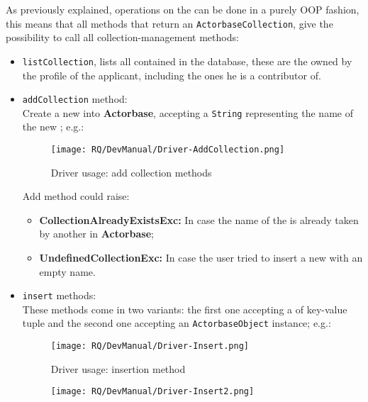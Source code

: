 \documentclass{scalatekids-article}
\begin{document}
As previously explained, operations on the  can be done in a purely
OOP fashion, this means that all methods that return an \verb=ActorbaseCollection=,
give the possibility to call all collection-management methods:

\begin{itemize}
\item \verb=listCollection=, lists all 
contained in the database, these are the 
owned by the profile of the applicant, including the ones he is a contributor of.
\item \verb=addCollection= method:\\ Create a new  into \textbf{Actorbase}, accepting a \verb=String=
  representing the name of the new ;
  e.g.:
  \begin{figure}[H]
    \begin{center}
      \texttt{[image: RQ/DevManual/Driver-AddCollection.png]}
      \caption{Driver usage: add collection  methods}
    \end{center}
  \end{figure}
  Add  method could raise:
  \begin{itemize}
  \item \textbf{CollectionAlreadyExistsExc:} In case the name of the  is already taken by another  in \textbf{Actorbase};
  \item \textbf{UndefinedCollectionExc:} In case the user tried to insert a new  with an empty name.
  \end{itemize}
\item \verb=insert= methods:\\ These methods come in two variants: the first one accepting
  a  of key-value tuple and the second
  one accepting an
  \verb=ActorbaseObject= instance;
  e.g.:
  \begin{figure}[H]
    \begin{center}
      \texttt{[image: RQ/DevManual/Driver-Insert.png]}
      \caption{Driver usage: insertion method}
    \end{center}
  \end{figure}
  \begin{figure}[H]
    \begin{center}
      \texttt{[image: RQ/DevManual/Driver-Insert2.png]}

\end{center}
\end{figure}
\end{itemize}
\end{document}
